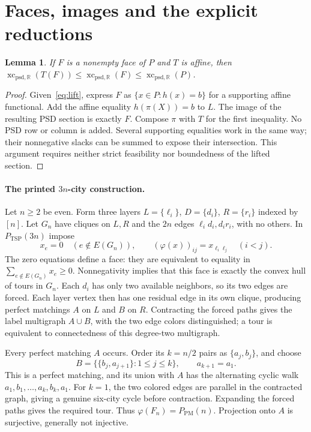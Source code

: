 \documentclass[11pt]{article}
\newtheorem{lemma}[theorem]{Lemma}
\newcommand{\R}{\mathbb R}
\newcommand{\sxc}{\operatorname{xc}_{\mathrm{psd},\R}}
\newcommand{\PM}{P_{\mathrm{PM}}}
\newcommand{\TSP}{P_{\mathrm{TSP}}}
\begin{document}
\section{Faces, images and the explicit reductions}
\begin{lemma}\label{lem:monotone}
If $F$ is a nonempty face of $P$ and $T$ is affine, then
$\sxc(T(F))\le\sxc(F)\le\sxc(P)$.
\end{lemma}
\begin{proof}
Given~\eqref{eq:lift}, express $F$ as $\{x\in P:h(x)=b\}$ for a supporting affine functional. Add the affine equality $h(\pi(X))=b$ to $L$. The image of the resulting PSD section is exactly $F$. Compose $\pi$ with $T$ for the first inequality. No PSD row or column is added. Several supporting equalities work in the same way; their nonnegative slacks can be summed to expose their intersection. This argument requires neither strict feasibility nor boundedness of the lifted section.
\end{proof}

\paragraph{The printed $3n$-city construction.}
Let $n\ge2$ be even. Form three layers $L=\{\ell_i\}$, $D=\{d_i\}$, $R=\{r_i\}$ indexed by $[n]$. Let $G_n$ have cliques on $L,R$ and the $2n$ edges $\ell_id_i,d_ir_i$, with no others. In $\TSP(3n)$ impose
\begin{equation}\label{eq:3nface}
 x_e=0\quad(e\notin E(G_n)),\qquad
 (\varphi(x))_{ij}=x_{\ell_i\ell_j}\quad(i<j).
\end{equation}
The zero equations define a face: they are equivalent to equality in $\sum_{e\notin E(G_n)}x_e\ge0$. Nonnegativity implies that this face is exactly the convex hull of tours in $G_n$. Each $d_i$ has only two available neighbors, so its two edges are forced. Each layer vertex then has one residual edge in its own clique, producing perfect matchings $A$ on $L$ and $B$ on $R$. Contracting the forced paths gives the label multigraph $A\cup B$, with the two edge colors distinguished; a tour is equivalent to connectedness of this degree-two multigraph.

Every perfect matching $A$ occurs. Order its $k=n/2$ pairs as $\{a_j,b_j\}$, and choose
\begin{equation}\label{eq:completion}
 B=\bigl\{\{b_j,a_{j+1}\}:1\le j\le k\bigr\},\qquad a_{k+1}=a_1.
\end{equation}
This is a perfect matching, and its union with $A$ has the alternating cyclic walk $a_1,b_1,\ldots,a_k,b_k,a_1$. For $k=1$, the two colored edges are parallel in the contracted graph, giving a genuine six-city cycle before contraction. Expanding the forced paths gives the required tour. Thus $\varphi(F_n)=\PM(n)$. Projection onto $A$ is surjective, generally not injective.
\end{document}
